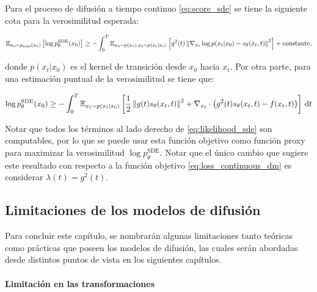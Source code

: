 \begin{teo}
    \label{teo:dm_likelihood}

    Para el proceso de difusión a tiempo continuo \eqref{eq:score_sde} se tiene la siguiente cota para la verosimilitud esperada:

    \begin{equation}
        \label{eq:likelihood_sde}
        \mathbb{E}_{x_0\sim p_{\operatorname{true}}(x_0)}\left[\log p_\theta^{\operatorname{SDE}}(x_0)\right] \geq
        - \int_0^T \mathbb{E}_{x_0\sim p(x_0), x_t\sim p(x_t|x_0)}\left[g^2(t)\left\lVert \nabla_{x_t} \log p(x_t|x_0) - s_\theta(x_t,t) \right\rVert^2\right] + \operatorname{constante},
    \end{equation}

    donde $p(x_t|x_0)$ es el kernel de transición desde $x_0$ hacia $x_t$. Por otra parte, para una estimación puntual de la verosimilitud se tiene que:

    \begin{equation*}
        \log p_\theta^{\operatorname{SDE}}(x_0)
        \geq - \int_0^T \mathbb{E}_{x_t\sim p(x_t|x_0)}\left[\frac{1}{2}\left\lVert g(t)s_\theta(x_t,t) \right\rVert^2 + \nabla_{x_t}\cdot\left(g^2(t)s_\theta(x_t,t)-f(x_t,t)\right)\right] \,\operatorname{d}\! t
    \end{equation*}

\end{teo}

Notar que todos los términos al lado derecho de \eqref{eq:likelihood_sde} son computables, por lo que se puede usar esta función objetivo como función proxy para maximizar la verosimilitud $\log p_\theta^{\operatorname{SDE}}$. Notar que el único cambio que sugiere este resultado con respecto a la función objetivo \eqref{eq:loss_continuous_dm} es considerar $\lambda(t)=g^2(t)$.

\subsection{Limitaciones de los modelos de difusión}
\label{dm/continuous_dm/limitations}

Para concluir este capítulo, se nombrarán algunas limitaciones tanto teóricas como prácticas que poseen los modelos de difusión, las cuales serán abordadas desde distintos puntos de vista en los siguientes capítulos.

\paragraph{Limitación en las transformaciones}

